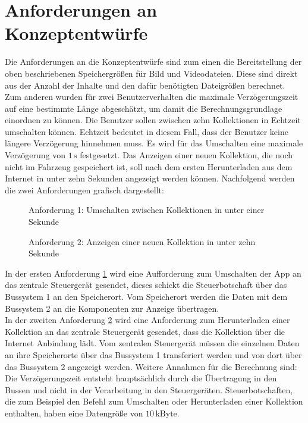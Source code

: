 \section{Anforderungen an Konzeptentwürfe}
Die Anforderungen an die Konzeptentwürfe sind zum einen die Bereitstellung der oben beschriebenen Speichergrößen für Bild und Videodateien. Diese sind direkt aus der Anzahl der Inhalte und den dafür benötigten Dateigrößen berechnet. \\
Zum anderen wurden für zwei Benutzerverhalten die maximale Verzögerungszeit auf eine bestimmte Länge abgeschätzt, um damit die Berechnungsgrundlage einordnen zu können. Die Benutzer sollen zwischen zehn Kollektionen in Echtzeit umschalten können. Echtzeit bedeutet in diesem Fall, dass der Benutzer keine längere Verzögerung hinnehmen muss. Es wird für das Umschalten eine maximale Verzögerung von $ 1\,\mathrm{s} $ festgesetzt.
Das Anzeigen einer neuen Kollektion, die noch nicht im Fahrzeug gespeichert ist, soll nach dem ersten Herunterladen aus dem Internet in unter zehn Sekunden angezeigt werden können.
Nachfolgend werden die zwei Anforderungen grafisch dargestellt:
\begin{figure}[]
	\centering
	
	\caption[Anforderung 1: Umschalten zwischen Kollektionen in unter einer Sekunde]{Anforderung 1: Umschalten zwischen Kollektionen in unter einer Sekunde}
	\label{fig:anforderung1}
\end{figure}
\begin{figure}[]
	\centering
	
	\caption[Anforderung 2: Anzeigen einer neuen Kollektion in unter zehn Sekunde]{Anforderung 2: Anzeigen einer neuen Kollektion in unter zehn Sekunde}
	\label{fig:anforderung2}
\end{figure}
In der ersten Anforderung \ref{fig:anforderung1} wird eine Aufforderung zum Umschalten der App an das zentrale Steuergerät gesendet, dieses schickt die Steuerbotschaft über das Bussystem 1 an den Speicherort. Vom Speicherort werden die Daten mit dem Bussystem 2 an die Komponenten zur Anzeige übertragen. \\
In der zweiten Anforderung \ref{fig:anforderung2} wird eine Anforderung zum Herunterladen einer Kollektion an das zentrale Steuergerät gesendet, dass die Kollektion über die Internet Anbindung lädt. Vom zentralen Steuergerät müssen die einzelnen Daten an ihre Speicherorte über das Bussystem 1 transferiert werden und von dort über das Bussystem 2 angezeigt werden.
Weitere Annahmen für die Berechnung sind: 
Die Verzögerungszeit entsteht hauptsächlich durch die Übertragung in den Bussen und nicht in  der Verarbeitung in den Steuergeräten.
Steuerbotschaften, die zum Beispiel den Befehl zum Umschalten oder Herunterladen einer Kollektion enthalten, haben eine Datengröße von $ 10\,\mathrm{kByte} $.
